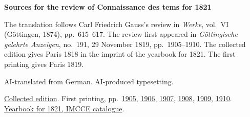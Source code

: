 \clearpage\thispagestyle{empty}
\begin{center}\Large\bfseries Sources for the review of Connaissance des tems for 1821\end{center}

The translation follows Carl Friedrich Gauss’s review in \emph{Werke}, vol.~VI (Göttingen, 1874), pp.~615--617. The review first appeared in \emph{Göttingische gelehrte Anzeigen}, no.~191, 29 November 1819, pp.~1905--1910. The collected edition gives Paris 1818 in the imprint of the yearbook for 1821. The first printing gives Paris 1819.

AI-translated from German. AI-produced typesetting.

\href{https://gdz.sub.uni-goettingen.de/id/PPN236007467}{Collected edition}. First printing, pp.~\href{https://images.p.sub.uni-goettingen.de/iiif/image/gdz:PPN319721507_1819:00001919/full/1650,/0/default.jpg}{1905}, \href{https://images.p.sub.uni-goettingen.de/iiif/image/gdz:PPN319721507_1819:00001920/full/1650,/0/default.jpg}{1906}, \href{https://images.p.sub.uni-goettingen.de/iiif/image/gdz:PPN319721507_1819:00001921/full/1650,/0/default.jpg}{1907}, \href{https://images.p.sub.uni-goettingen.de/iiif/image/gdz:PPN319721507_1819:00001922/full/1650,/0/default.jpg}{1908}, \href{https://images.p.sub.uni-goettingen.de/iiif/image/gdz:PPN319721507_1819:00001923/full/1650,/0/default.jpg}{1909}, \href{https://images.p.sub.uni-goettingen.de/iiif/image/gdz:PPN319721507_1819:00001924/full/1650,/0/default.jpg}{1910}. \href{https://cdt.imcce.fr/items/show/170}{Yearbook for 1821, IMCCE catalogue}.

\clearpage
